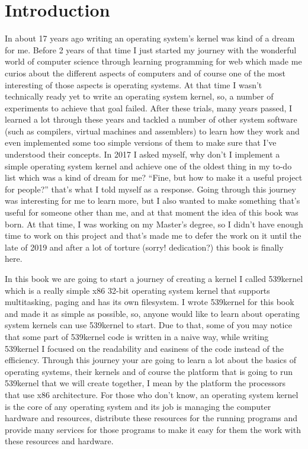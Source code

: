 \chapter*{Introduction}\label{introduction}

In about 17 years ago writing an operating system's kernel was kind of a
dream for me. Before 2 years of that time I just started my journey with
the wonderful world of computer science through learning programming for
web which made me curios about the different aspects of computers and of
course one of the most interesting of those aspects is operating
systems. At that time I wasn't technically ready yet to write an
operating system kernel, so, a number of experiments to achieve that
goal failed. After these trials, many years passed, I learned a lot
through these years and tackled a number of other system software (such
as compilers, virtual machines and assemblers) to learn how they work
and even implemented some too simple versions of them to make sure that
I've understood their concepts. In 2017 I asked myself, why don't I
implement a simple operating system kernel and achieve one of the oldest
thing in my to-do list which was a kind of dream for me? ``Fine, but how
to make it a useful project for people?'' that's what I told myself as a
response. Going through this journey was interesting for me to learn
more, but I also wanted to make something that's useful for someone
other than me, and at that moment the idea of this book was born. At
that time, I was working on my Master's degree, so I didn't have enough
time to work on this project and that's made me to defer the work on it
until the late of 2019 and after a lot of torture (sorry! dedication?)
this book is finally here.

In this book we are going to start a journey of creating a kernel I
called 539kernel which is a really simple x86 32-bit operating system
kernel that supports multitasking, paging and has its own filesystem. I
wrote 539kernel for this book and made it as simple as possible, so,
anyone would like to learn about operating system kernels can use
539kernel to start. Due to that, some of you may notice that some part
of 539kernel code is written in a naive way, while writing 539kernel I
focused on the readability and easiness of the code instead of the
efficiency. Through this journey your are going to learn a lot about the
basics of operating systems, their kernels and of course the platform
that is going to run 539kernel that we will create together, I mean by
the platform the processors that use x86 architecture. For those who
don't know, an operating system kernel is the core of any operating
system and its job is managing the computer hardware and resources,
distribute these resources for the running programs and provide many
services for those programs to make it easy for them the work with these
resources and hardware.

